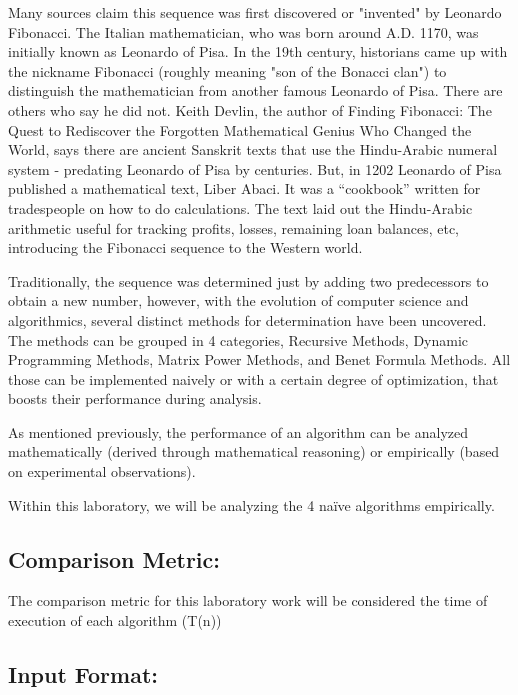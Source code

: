 \documentclass[12pt]{article}
\begin{document}
Many sources claim this sequence was first discovered or "invented" by Leonardo Fibonacci. The 
Italian mathematician, who was born around A.D. 1170, was initially known as Leonardo of Pisa. In the 
19th century, historians came up with the nickname Fibonacci (roughly meaning "son of the Bonacci 
clan") to distinguish the mathematician from another famous Leonardo of Pisa. 
There are others who say he did not. Keith Devlin, the author of Finding Fibonacci: The Quest to 
Rediscover the Forgotten Mathematical Genius Who Changed the World, says there are ancient Sanskrit 
texts that use the Hindu-Arabic numeral system - predating Leonardo of Pisa by centuries. 
But, in 1202 Leonardo of Pisa published a mathematical text, Liber Abaci. It was a “cookbook” written 
for tradespeople on how to do calculations. The text laid out the Hindu-Arabic arithmetic useful for 
tracking profits, losses, remaining loan balances, etc, introducing the Fibonacci sequence to the Western 
world. 

Traditionally, the sequence was determined just by adding two predecessors to obtain a new 
number, however, with the evolution of computer science and algorithmics, several distinct methods for 
determination have been uncovered. The methods can be grouped in 4 categories, Recursive Methods, 
Dynamic Programming Methods, Matrix Power Methods, and Benet Formula Methods. All those can be 
implemented naively or with a certain degree of optimization, that boosts their performance during 
analysis. 

As mentioned previously, the performance of an algorithm can be analyzed mathematically 
(derived through mathematical reasoning) or empirically (based on experimental observations).  

Within this laboratory, we will be analyzing the 4 naïve algorithms empirically.   

\subsection*{Comparison Metric:}
\hspace{0.8cm} The comparison metric for this laboratory work will be considered the time of execution of each 
algorithm (T(n)) 

\subsection*{Input Format:}
\end{document}
